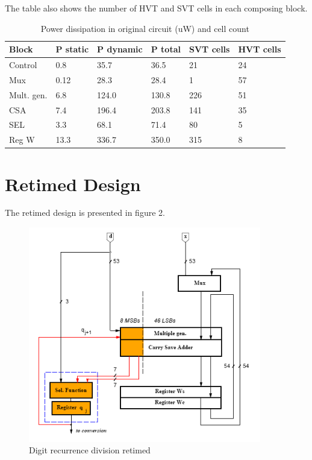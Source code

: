 \documentclass[11pt,a4paper]{article}
\begin{document}
The table also shows the number of HVT and SVT cells in each composing block.

\begin{table}[!]
\caption{Power dissipation in original circuit (uW) and cell count}
\begin{center}
\begin{tabular}{|l|l|l|l|l|l|}
\hline
\textbf{Block}	& \textbf{P static}		& \textbf{P dynamic}	& \textbf{P total} & \textbf{SVT cells} & \textbf{HVT cells}\\ \hline
Control & 0.8 & 35.7 & 36.5 & 21 & 24 \\ \hline
Mux & 0.12 & 28.3 & 28.4 & 1 & 57 	\\ \hline
Mult. gen. & 6.8 & 124.0 & 130.8 & 226 & 51 	\\ \hline
CSA & 7.4 & 196.4 & 203.8 & 141 & 35 	\\ \hline
SEL & 3.3 & 68.1 & 71.4 & 80 & 5 	\\ \hline
Reg W & 13.3 & 336.7 & 350.0 & 315 & 8 	\\ \hline
\end{tabular}
\end{center}
\label{table:powerOriginal}
\end{table}
\floatbarrier
\section{Retimed Design}
\floatbarrier
The retimed design is presented in figure 2.

\begin{figure}[h !]
	\centering
		\includegraphics[width=4in]{./retiming.PNG}
	\caption{Digit recurrence division retimed}
	\label{fig:retiming}
\end{figure}
\end{document}

